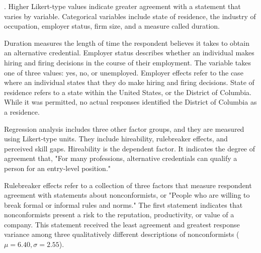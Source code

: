 \documentclass[review]{elsarticle}
\begin{document}
{    %
}.
Higher Likert-type values indicate greater agreement with a statement that varies by variable.
Categorical variables include state of residence,
the industry of occupation,
employer status,
firm size,
and a measure called duration.

Duration measures the length of time the respondent believes it takes to obtain an alternative credential.
Employer status describes whether an individual makes hiring and firing decisions in the course of their employment.
The variable takes one of three values: yes, no, or unemployed.
Employer effects refer to the case where an individual states that they do make hiring and firing decisions.
State of residence refers to a state within the United States, or the District of Columbia.
While it was permitted, no actual responses identified the District of Columbia as a residence.

Regression analysis includes three other factor groups, and they are measured using Likert-type units.
They include hireability, rulebreaker effects, and perceived skill gaps.
Hireability is the dependent factor.
It indicates the degree of agreement that, "For many professions, alternative credentials can qualify a person for an entry-level position."

Rulebreaker effects refer to a collection of three factors that measure respondent agreement with statements about nonconformists, or "People who are willing to break formal or informal rules and norms."
The first statement indicates that nonconformists present a risk to the reputation, productivity, or value of a company.
This statement received the least agreement and greatest response variance among three qualitatively different descriptions of nonconformists ($\mu = 6.40, \sigma = 2.55$).
\end{document}
